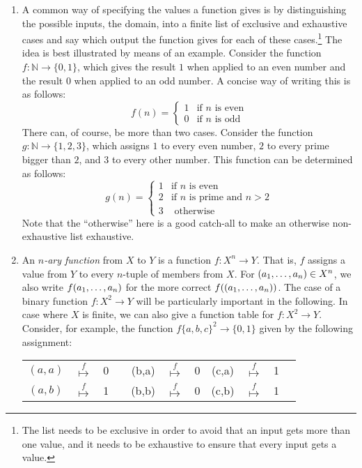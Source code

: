 \begin{enumerate}[\thesection.1]
\item A common way of specifying the values a function gives is by distinguishing the possible inputs, the domain, into a finite list of exclusive and exhaustive cases and say which output the function gives for each of these cases.\footnote{The list needs to be exclusive in order to avoid that an input gets more than one value, and it needs to be exhaustive to ensure that every input gets a value.} The idea is best illustrated by means of an example. Consider the function $f:\mathbb{N}\to\{0,1\}$, which gives the result $1$ when applied to an even number and the result $0$ when applied to an odd number. A concise way of writing this is as follows: \[f(n)=\begin{cases} 1 & \text{if }n\text{ is even}\\0 &\text{if }n\text{ is odd}\end{cases}\] There can, of course, be more than two cases. Consider the function $g:\mathbb{N}\to\{1, 2, 3\}$, which assigns $1$ to every even number, $2$ to every prime bigger than $2$, and $3$ to every other number. This function can be determined as follows:
\[g(n)=\begin{cases} 1 & \text{if }n\text{ is even}\\2 &\text{if }n\text{ is prime and }n>2\\3&\text{ otherwise}\end{cases}\] Note that the ``otherwise'' here is a good catch-all to make an otherwise non-exhaustive list exhaustive.

\item An \emph{$n$-ary function} from $X$ to $Y$ is a function $f:X^n\to Y$. That is, $f$ assigns a value from $Y$ to every $n$-tuple of members from $X$. For $(a_1, \mathellipsis, a_n)\in X^n$, we also write $f(a_1, \mathellipsis, a_n)$ for the more correct $f((a_1, \mathellipsis, a_n))$. The case of a binary function $f:X^2\to Y$ will be particularly important in the following. In case where $X$ is finite, we can also give a function table for $f:X^2\to Y$. Consider, for example, the function $f\{a,b,c\}^2\to \{0,1\}$ given by the following assignment:
\begin{center}
	\begin{tabular}{c c c c c c c c c c c}
	$(a,a)$ & $\overset{f}{\mapsto}$ & 0 & \quad & (b,a) & $\overset{f}{\mapsto}$ & 0  \quad & (c,a) & $\overset{f}{\mapsto}$ & 1\\

	$(a,b)$ & $\overset{f}{\mapsto}$ & 1 & \quad & (b,b) & $\overset{f}{\mapsto}$ & 0  \quad & (c,b) & $\overset{f}{\mapsto}$ & 1\\



\end{tabular}
\end{center}
\end{enumerate}
